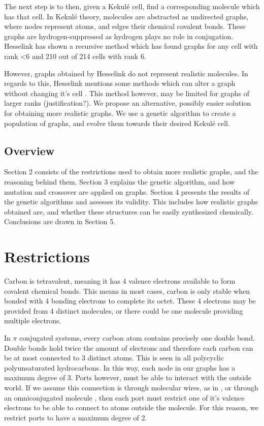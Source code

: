 \documentclass[12pt]{article}
\begin{document}
The next step is to then, given a Kekul\'e cell, find a corresponding molecule which has that cell. In Kekul\'e theory, molecules are abstracted as undirected graphs, where nodes represent atoms, and edges their chemical covalent bonds. These graphs are hydrogen-suppressed as hydrogen plays no role in conjugation. Hesselink \cite{H13} has shown a recursive method which has found graphs for any cell with rank \textless 6 and 210 out of 214 cells with rank 6. 

However, graphs obtained by Hesselink do not represent realistic molecules. In regards to this, Hesselink mentions some methods which can alter a graph without changing it's cell \cite{HH13, v06}. This method however, may be limited for graphs of larger ranks (justification?). We propose an alternative, possibly easier solution for obtaining more realistic graphs. We use a genetic algorithm to create a population of graphs, and evolve them towards their desired Kekul\'e cell. 

\subsection{Overview}

Section 2 consists of the restrictions used to obtain more realistic graphs, and the reasoning behind them. Section 3 explains the genetic algorithm, and how mutation and crossover are applied on graphs. Section 4 presents the results of the genetic algorithms and assesses its validity. This includes how realistic graphs obtained are, and whether these structures can be easily synthesized chemically. Conclusions are drawn in Section 5.

\section{Restrictions}

Carbon is tetravalent, meaning it has 4 valence electrons available to form covalent chemical bonds. This means in most cases, carbon is only stable when bonded with 4 bonding electrons to complete its octet. These 4 electrons may be provided from 4 distinct molecules, or there could be one molecule providing multiple electrons.

In $\pi$ conjugated systems, every carbon atom contains precisely one double bond. Double bonds hold twice the amount of electrons and therefore each carbon can be at most connected to 3 distinct atoms. This is seen in all polycyclic polyunsaturated hydrocarbons. In this way, each node in our graphs has a maximum degree of 3. Ports however, must be able to interact with the outside world. If we assume this connection is through molecular wires, as in \cite{9}, or through an omniconjugated molecule \cite{v06}, then each port must restrict one of it's valence electrons to be able to connect to atoms outside the molecule. For this reason, we restrict ports to have a maximum degree of 2. 
\end{document}
